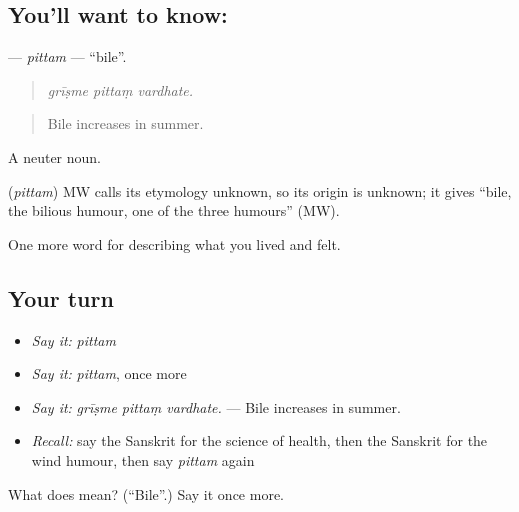 \subsection*{You'll want to know: }
\textbf{} — \emph{pittam} — \textquotedblleft{}bile\textquotedblright{}.

\begin{quote}
  
\end{quote}

\begin{quote}
\emph{grīṣme pittaṃ vardhate.}
\end{quote}

\begin{quote}
Bile increases in summer.
\end{quote}

A neuter noun.

\begin{cousinweb}
\textbf{} (\emph{pittam}) MW calls its etymology unknown, so its origin is unknown; it gives \textquotedblleft{}bile, the bilious humour, one of the three humours\textquotedblright{} (MW).
\end{cousinweb}

\begin{grammarlens}[title={What you've built}]
One more word for describing what you lived and felt.
\end{grammarlens}

\subsection*{Your turn}
\begin{itemize}
\raggedright
  \item \emph{Say it:} \emph{pittam}
  \item \emph{Say it:} \emph{pittam}, once more
  \item \emph{Say it:} \emph{grīṣme pittaṃ vardhate.} — Bile increases in summer.
  \item \emph{Recall:} say the Sanskrit for the science of health, then the Sanskrit for the wind humour, then say \emph{pittam} again
\end{itemize}

\begin{tcolorbox}[breakable,colback=teal!4,colframe=teal!35!black,title={Before you move on}]
What does  mean? (\textquotedblleft{}Bile\textquotedblright{}.) Say it once more.
\end{tcolorbox}
